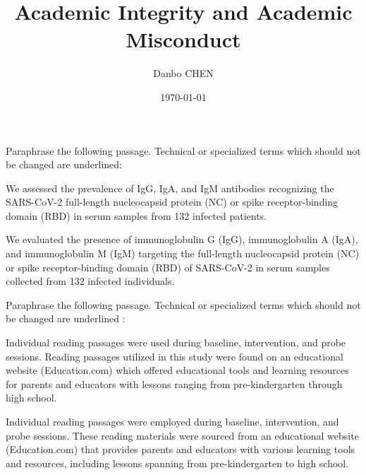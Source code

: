 \documentclass{homework}
\author{Danbo CHEN}
\date{\today}
\title{Academic Integrity and Academic Misconduct}
\begin{document}
 \maketitle

\question Paraphrase the following passage. Technical or specialized terms which should not be changed are underlined:

We assessed the prevalence of IgG, IgA, and IgM antibodies recognizing the SARS-CoV-2 full-length nucleocapsid protein (NC) or spike receptor-binding domain (RBD) in serum samples from 132 infected patients.

\begin{sol}

We evaluated the presence of immunoglobulin G (IgG), immunoglobulin A (IgA), and immunoglobulin M (IgM) targeting the full-length nucleocapsid protein (NC) or spike receptor-binding domain (RBD) of SARS-CoV-2 in serum samples collected from 132 infected individuals.

  
\end{sol}

\question Paraphrase the following passage. Technical or specialized terms which should not  be changed are  underlined :

Individual reading passages were used during baseline, intervention, and probe sessions. Reading passages utilized in this study were found on an educational website (Education.com) which offered educational tools and learning resources for parents and educators with lessons ranging from pre-kindergarten through high school.

\begin{sol}

Individual reading passages were employed during baseline, intervention, and probe sessions. These reading materials were sourced from an educational website (Education.com) that provides parents and educators with various learning tools and resources, including lessons spanning from pre-kindergarten to high school.

\end{sol}


\end{document}
